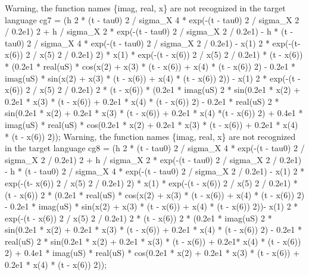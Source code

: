\begin{maplegroup}
\underline{}Warning, the function names \{imag, real, x\} are not recognized in the target language\underline{}\mapleresult
cg7 = (h  2 * (t - tau0)  2 / sigma\_X  4 * exp(-(t - tau0)  2 / sigma\_X  2 / 0.2e1)  2 + h / sigma\_X  2 * exp(-(t - tau0)  2 / sigma\_X  2 / 0.2e1) - h * (t - tau0)  2 / sigma\_X  4 * exp(-(t - tau0)  2 / sigma\_X  2 / 0.2e1) - x(1)  2 * exp(-(t- x(6))  2 / x(5)  2 / 0.2e1)  2) * x(1) * exp(-(t - x(6))  2 / x(5)  2 / 0.2e1) * (t - x(6)) * (0.2e1 * real(uS) * cos(x(2) + x(3) * (t - x(6)) + x(4) * (t - x(6))  2) - 0.2e1 * imag(uS) * sin(x(2) + x(3) * (t - x(6)) + x(4) * (t - x(6))  2)) - x(1)  2 * exp(-(t - x(6))  2 / x(5)  2 / 0.2e1)  2 * (t - x(6)) * (0.2e1 * imag(uS)  2 * sin(0.2e1 * x(2) + 0.2e1 * x(3) * (t - x(6)) + 0.2e1 * x(4) * (t - x(6))  2) - 0.2e1 * real(uS)  2 * sin(0.2e1 * x(2) + 0.2e1 * x(3) * (t - x(6)) + 0.2e1 * x(4) *(t - x(6))  2) + 0.4e1 * imag(uS) * real(uS) * cos(0.2e1 * x(2) + 0.2e1 * x(3) * (t - x(6)) + 0.2e1 * x(4) * (t - x(6))  2));
\underline{}Warning, the function names \{imag, real, x\} are not recognized in the target language\underline{}\mapleresult
cg8 = (h  2 * (t - tau0)  2 / sigma\_X  4 * exp(-(t - tau0)  2 / sigma\_X  2 / 0.2e1)  2 + h / sigma\_X  2 * exp(-(t - tau0)  2 / sigma\_X  2 / 0.2e1) - h * (t - tau0)  2 / sigma\_X  4 * exp(-(t - tau0)  2 / sigma\_X  2 / 0.2e1) - x(1)  2 * exp(-(t- x(6))  2 / x(5)  2 / 0.2e1)  2) * x(1) * exp(-(t - x(6))  2 / x(5)  2 / 0.2e1) * (t - x(6))  2 * (0.2e1 * real(uS) * cos(x(2) + x(3) * (t - x(6)) + x(4) * (t - x(6))  2) - 0.2e1 * imag(uS) * sin(x(2) + x(3) * (t - x(6)) + x(4) * (t - x(6))  2))- x(1)  2 * exp(-(t - x(6))  2 / x(5)  2 / 0.2e1)  2 * (t - x(6))  2 * (0.2e1 * imag(uS)  2 * sin(0.2e1 * x(2) + 0.2e1 * x(3) * (t - x(6)) + 0.2e1 * x(4) * (t - x(6))  2) - 0.2e1 * real(uS)  2 * sin(0.2e1 * x(2) + 0.2e1 * x(3) * (t - x(6)) + 0.2e1* x(4) * (t - x(6))  2) + 0.4e1 * imag(uS) * real(uS) * cos(0.2e1 * x(2) + 0.2e1 * x(3) * (t - x(6)) + 0.2e1 * x(4) * (t - x(6))  2));

\end{maplegroup}
